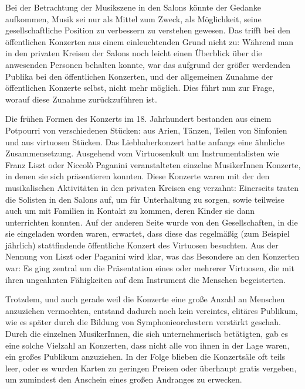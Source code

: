 \documentclass[a4paper, german, oneside]{scrbook}
\begin{document}
Bei der Betrachtung der Musikszene in den Salons könnte der Gedanke aufkommen, Musik sei nur als Mittel zum Zweck, als Möglichkeit, seine gesellschaftliche Position zu verbessern zu verstehen gewesen. Das trifft bei den öffentlichen Konzerten aus einem einleuchtenden Grund nicht zu: Während man in den privaten Kreisen der Salons noch leicht einen Überblick über die anwesenden Personen behalten konnte, war das aufgrund der größer werdenden Publika bei den öffentlichen Konzerten, und der allgemeinen Zunahme der öffentlichen Konzerte selbst, nicht mehr möglich. \parencite[vgl.][37]{weber_music_2004} Dies führt nun zur Frage, worauf diese Zunahme zurückzuführen ist. 

Die frühen Formen des Konzerts im 18. Jahrhundert bestanden aus einem Potpourri von verschiedenen Stücken: aus Arien, Tänzen, Teilen von Sinfonien und aus virtuosen Stücken. Das Liebhaberkonzert hatte anfangs eine ähnliche Zusammensetzung. Ausgehend vom Virtuosenkult um Instrumentalisten wie Franz Liszt oder Niccolò Paganini veranstalteten einzelne MusikerInnen Konzerte, in denen sie sich präsentieren konnten. Diese Konzerte waren mit der den musikalischen Aktivitäten in den privaten Kreisen eng verzahnt: Einerseits traten die Solisten in den Salons auf, um für Unterhaltung zu sorgen, sowie teilweise auch um mit Familien in Kontakt zu kommen, deren Kinder sie dann unterrichten konnten. Auf der anderen Seite wurde von den Gesellschaften, in die sie eingeladen worden waren, erwartet, dass diese das regelmäßig (zum Beispiel jährlich) stattfindende öffentliche Konzert des Virtuosen besuchten. Aus der Nennung von Liszt oder Paganini wird klar, was das Besondere an den Konzerten war: Es ging zentral um die Präsentation eines oder mehrerer Virtuosen, die mit ihren ungeahnten Fähigkeiten auf dem Instrument die Menschen begeisterten. \parencite[vgl.][24]{weber_music_2004}

Trotzdem, und auch gerade weil die Konzerte eine große Anzahl an Menschen anzuziehen vermochten, entstand dadurch noch kein vereintes, elitäres Publikum, wie es später durch die Bildung von Symphonieorchestern verstärkt geschah. Durch die einzelnen MusikerInnen, die sich unternehmerisch betätigten, gab es eine solche Vielzahl an Konzerten, dass nicht alle von ihnen in der Lage waren, ein großes Publikum anzuziehen. In der Folge blieben die Konzertsäle oft teils leer, oder es wurden Karten zu geringen Preisen oder überhaupt gratis vergeben, um zumindest den Anschein eines großen Andranges zu erwecken. \parencite[vgl.][49ff.]{weber_music_2004}
\end{document}

